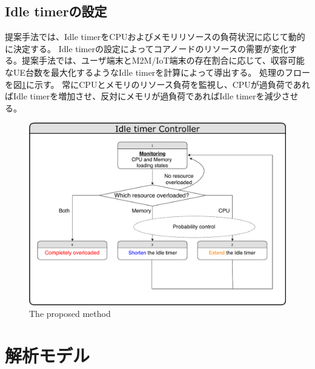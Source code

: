 \documentclass[a4j]{ujarticle}
\begin{document}
\subsection{Idle timerの設定}
提案手法では、Idle timerをCPUおよびメモリリソースの負荷状況に応じて動的に決定する。
Idle timerの設定によってコアノードのリソースの需要が変化する。提案手法では、ユーザ端末とM2M/IoT端末の存在割合に応じて、収容可能なUE台数を最大化するようなIdle timerを計算によって導出する。
処理のフローを図\ref{proposed_method}に示す。
常にCPUとメモリのリソース負荷を監視し、CPUが過負荷であればIdle timerを増加させ、反対にメモリが過負荷であればIdle timerを減少させる。
\begin{figure}[htbp]
	\centering
	\includegraphics[width=0.7\hsize]{proposed_method.pdf}
  \caption{The proposed method}
	\label{proposed_method}
\end{figure}


\clearpage

\section{解析モデル}
\end{document}
